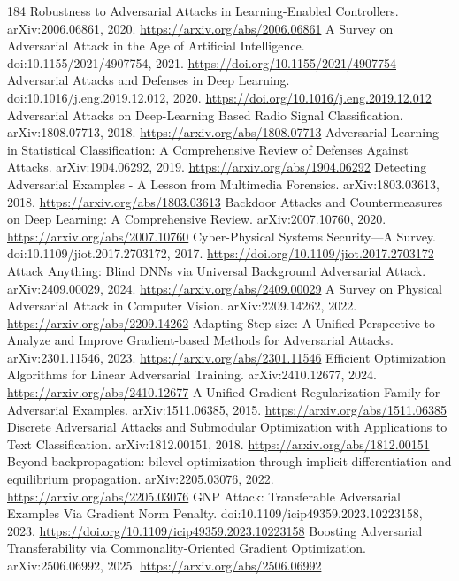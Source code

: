 \documentclass[11pt]{article}
\begin{document}
\begin{thebibliography}{184}
 Robustness to Adversarial Attacks in Learning-Enabled Controllers. arXiv:2006.06861, 2020. \url{https://arxiv.org/abs/2006.06861}
 A Survey on Adversarial Attack in the Age of Artificial Intelligence. doi:10.1155/2021/4907754, 2021. \url{https://doi.org/10.1155/2021/4907754}
 Adversarial Attacks and Defenses in Deep Learning. doi:10.1016/j.eng.2019.12.012, 2020. \url{https://doi.org/10.1016/j.eng.2019.12.012}
 Adversarial Attacks on Deep-Learning Based Radio Signal Classification. arXiv:1808.07713, 2018. \url{https://arxiv.org/abs/1808.07713}
 Adversarial Learning in Statistical Classification: A Comprehensive Review of Defenses Against Attacks. arXiv:1904.06292, 2019. \url{https://arxiv.org/abs/1904.06292}
 Detecting Adversarial Examples - A Lesson from Multimedia Forensics. arXiv:1803.03613, 2018. \url{https://arxiv.org/abs/1803.03613}
 Backdoor Attacks and Countermeasures on Deep Learning: A Comprehensive Review. arXiv:2007.10760, 2020. \url{https://arxiv.org/abs/2007.10760}
 Cyber-Physical Systems Security—A Survey. doi:10.1109/jiot.2017.2703172, 2017. \url{https://doi.org/10.1109/jiot.2017.2703172}
 Attack Anything: Blind DNNs via Universal Background Adversarial Attack. arXiv:2409.00029, 2024. \url{https://arxiv.org/abs/2409.00029}
 A Survey on Physical Adversarial Attack in Computer Vision. arXiv:2209.14262, 2022. \url{https://arxiv.org/abs/2209.14262}
 Adapting Step-size: A Unified Perspective to Analyze and Improve Gradient-based Methods for Adversarial Attacks. arXiv:2301.11546, 2023. \url{https://arxiv.org/abs/2301.11546}
 Efficient Optimization Algorithms for Linear Adversarial Training. arXiv:2410.12677, 2024. \url{https://arxiv.org/abs/2410.12677}
 A Unified Gradient Regularization Family for Adversarial Examples. arXiv:1511.06385, 2015. \url{https://arxiv.org/abs/1511.06385}
 Discrete Adversarial Attacks and Submodular Optimization with Applications to Text Classification. arXiv:1812.00151, 2018. \url{https://arxiv.org/abs/1812.00151}
 Beyond backpropagation: bilevel optimization through implicit differentiation and equilibrium propagation. arXiv:2205.03076, 2022. \url{https://arxiv.org/abs/2205.03076}
 GNP Attack: Transferable Adversarial Examples Via Gradient Norm Penalty. doi:10.1109/icip49359.2023.10223158, 2023. \url{https://doi.org/10.1109/icip49359.2023.10223158}
 Boosting Adversarial Transferability via Commonality-Oriented Gradient Optimization. arXiv:2506.06992, 2025. \url{https://arxiv.org/abs/2506.06992}

\end{thebibliography}
\end{document}
